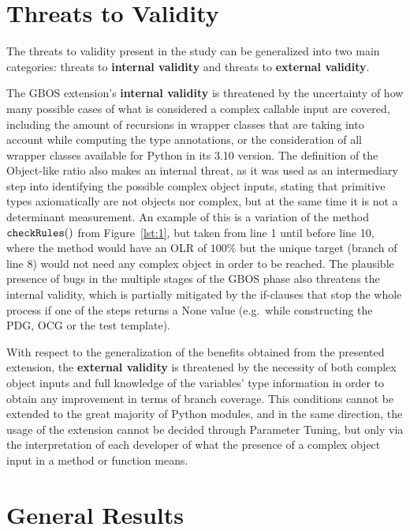 \documentclass[%
  chapterprefix=false,%
  open=right,%
  twoside=true,%
  paper=a4,%
  logofile={Figures/logo.png},%
  thesistype=master,%
  UKenglish,%
]{se2thesis}
\newcommand{\callable}[2][]{\(\text{\texttt{#2}}(#1)\)}
\begin{document}
\section{Threats to Validity}

The threats to validity present in the study can be generalized into two main categories: threats to \textbf{internal validity} and threats to \textbf{external validity}.

The GBOS extension's \textbf{internal validity} is threatened by the uncertainty of how many possible cases of what is considered a complex callable input are covered, including the amount of recursions in wrapper classes that are taking into account while computing the type annotations, or the consideration of all wrapper classes available for Python in its 3.10 version.
The definition of the Object-like ratio also makes an internal threat, as it was used as an intermediary step into identifying the possible complex object inputs, stating that primitive types axiomatically are not objects nor complex, but at the same time it is not a determinant measurement.
An example of this is a variation of the method \callable[]{checkRules} from Figure~\ref{lst:1}, but taken from line 1 until before line 10, where the method would have an OLR of \(100\%\) but the unique target (branch of line 8) would not need any complex object in order to be reached.
The plausible presence of bugs in the multiple stages of the GBOS phase also threatens the internal validity, which is partially mitigated by the if-clauses that stop the whole process if one of the steps returns a None value (e.g.\ while constructing the PDG, OCG or the test template).

With respect to the generalization of the benefits obtained from the presented extension, the \textbf{external validity} is threatened by the necessity of both complex object inputs and full knowledge of the variables' type information in order to obtain any improvement in terms of branch coverage.
This conditions cannot be extended to the great majority of Python modules, and in the same direction, the usage of the extension cannot be decided through Parameter Tuning, but only via the interpretation of each developer of what the presence of a complex object input in a method or function means.

\newpage

\section{General Results}
\end{document}
